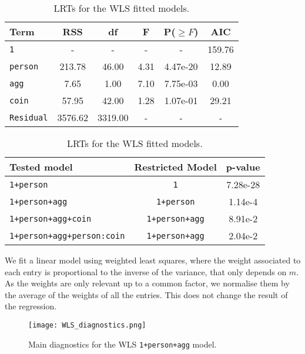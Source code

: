 \documentclass[a4paper, 12pt,oneside]{article}
\begin{document}
			\begin{table}[htb]
				\centering
				\begin{subtable}{\textwidth}
					\centering
					\caption{ANOVA (type II) of the WLS \texttt{1+person+agg+coin+person:coin} model and AIC values of cumulative terms.}
					\label{tab:WLS-AIC}
					\begin{tabular}{lccccc}
					\toprule
					Term & RSS & df & F & P($\ge F$) & AIC \\
					\midrule
					\texttt{1} & - & - & - & - & 159.76  \\
					\texttt{person} & 213.78 & 46.00 & 4.31 & 4.47e-20 & 12.89 \\
					\texttt{agg} & 7.65 & 1.00 & 7.10 & 7.75e-03 & 0.00 \\
					\texttt{coin} & 57.95 & 42.00 & 1.28 & 1.07e-01 & 29.21 \\
					\texttt{Residual} & 3576.62 & 3319.00 & - & - & - \\
					\bottomrule
					\end{tabular}
				\end{subtable}

				\begin{subtable}{\textwidth}
					\centering
					\caption{LRTs for the WLS fitted models.}
					\label{tab:WLS-LRT}
					\begin{tabular}{lcc}
					\toprule
					Tested model & Restricted Model & p-value \\
					\midrule
					\texttt{1+person} & \texttt{1} & 7.28e-28 \\
					\texttt{1+person+agg} & \texttt{1+person} & 1.14e-4 \\
					\texttt{1+person+agg+coin} & \texttt{1+person+agg} & 8.91e-2 \\
					\texttt{1+person+agg+person:coin} & \texttt{1+person+agg} & 2.04e-2 \\
					\bottomrule
					\end{tabular}
				\end{subtable}
			\end{table}	

			 We fit a linear model using weighted least squares, where the  weight associated to each entry is proportional to the inverse of the variance, that only depends on $m$. As the weights are only relevant up to a common factor, we normalise them by the average of the weights of all the entries. This does not change the result of the regression. 
			\begin{figure}[h!]
				\centering
				\texttt{[image: WLS\_diagnostics.png]}
				\caption{Main diagnostics for the WLS \texttt{1+person+agg} model.}
				\label{fig:wls-diagnostic}
			\end{figure}
			
\end{document}
